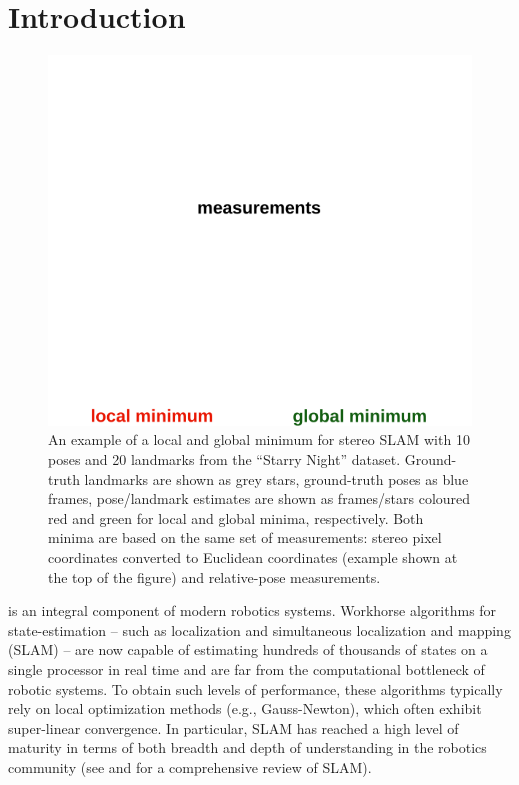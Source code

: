 \documentclass[lettersize,journal]{IEEEtran}
\newcommand{\rev}[1]{\color{red}{#1}\color{black}}
\begin{document}
\begin{IEEEkeywords}
	\rev{Localization, SLAM, Anisotropic, Certifiable, Optimization.}
\end{IEEEkeywords}

\section{Introduction}
\begin{figure}[!t]
	\centering
	\vspace*{-0.05in}
	\includegraphics[width=\columnwidth]{figs/slam_local_min}
	\vspace*{-0.3in}
	\caption{An example of a local and global minimum for stereo SLAM with 10 poses and 20 landmarks from the ``Starry Night'' dataset. Ground-truth landmarks are shown as grey stars, ground-truth poses as blue frames, pose/landmark estimates are shown as frames/stars coloured red and green for local and global minima, respectively. 
	Both minima are based on the same set of measurements: stereo pixel coordinates converted to Euclidean coordinates (example shown at the top of the figure) and relative-pose measurements.
	}
	\vspace*{-0.22in}
	\label{fig:slam_local_min}
\end{figure}

 is an integral component of modern robotics systems. Workhorse algorithms for state-estimation -- such as localization and simultaneous localization and mapping (SLAM) -- are now capable of estimating hundreds of thousands of states on a single processor in real time \cite{rosenAdvancesInferenceRepresentation2021} and are far from the computational bottleneck of robotic systems. To obtain such levels of performance, these algorithms typically rely on local optimization methods (e.g., Gauss-Newton), which often exhibit super-linear convergence. In particular, SLAM has reached a high level of maturity in terms of both breadth and depth of understanding in the robotics community (see \cite{baileySimultaneousLocalizationMapping2006} and \cite{durrant-whyteSimultaneousLocalizationMapping2006} for a comprehensive review of SLAM).  
\end{document}
